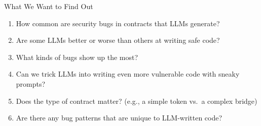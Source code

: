 \documentclass[aspectratio=169]{beamer}
\begin{document}
\begin{frame}{What We Want to Find Out}
\begin{enumerate}
    \item[\textbf{RQ1.}] How common are security bugs in contracts that LLMs generate?
    \vspace{0.3cm}
    \item[\textbf{RQ2.}] Are some LLMs better or worse than others at writing safe code?
    \vspace{0.3cm}
    \item[\textbf{RQ3.}] What kinds of bugs show up the most?
    \vspace{0.3cm}
    \item[\textbf{RQ4.}] Can we trick LLMs into writing even more vulnerable code with sneaky prompts?
    \vspace{0.3cm}
    \item[\textbf{RQ5.}] Does the type of contract matter? (e.g., a simple token vs.\ a complex bridge)
    \vspace{0.3cm}
    \item[\textbf{RQ6.}] Are there any bug patterns that are unique to LLM-written code?
\end{enumerate}
\end{frame}
\end{document}
